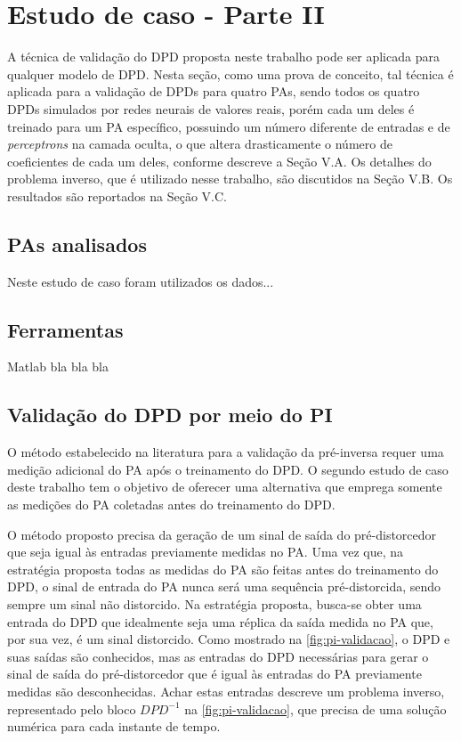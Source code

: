 \chapter{Estudo de caso - Parte II} \label{cha:estudoii}

A técnica de validação do DPD proposta neste trabalho pode ser aplicada para qualquer modelo de DPD. Nesta seção, como uma prova de conceito, {tal técnica é aplicada para a validação de DPDs para quatro PAs, sendo todos os quatro DPDs simulados por redes neurais de valores reais, porém cada um deles é treinado para um PA específico, possuindo um número diferente de entradas e de \textit{perceptrons} na camada oculta, o que altera drasticamente o número de coeficientes de cada um deles, conforme descreve a Seção V.A}. Os detalhes do problema inverso, que é utilizado nesse trabalho, são discutidos na Seção V.B. Os resultados são reportados na Seção V.C.

\section{PAs analisados} \label{sec:estudoii-pas}
Neste estudo de caso foram utilizados os dados...

\section{Ferramentas} \label{sec:estudoii-fer}
Matlab bla bla bla

\section{Validação do DPD por meio do PI} \label{sec:estudoii-dpd}
O método estabelecido na literatura para a validação da pré-inversa requer uma medição adicional do PA após o treinamento do DPD. O segundo estudo de caso deste trabalho tem o objetivo de oferecer uma alternativa que emprega somente as medições do PA coletadas antes do treinamento do DPD.

O método proposto precisa da geração de um sinal de saída do pré-distorcedor que seja igual às entradas previamente medidas no PA. Uma vez que, na estratégia proposta todas as medidas do PA são feitas antes do treinamento do DPD, o sinal de entrada do PA nunca será uma sequência pré-distorcida, sendo sempre um sinal não distorcido. Na estratégia proposta, busca-se obter uma entrada do DPD que idealmente seja uma réplica da saída medida no PA que, por sua vez, é um sinal distorcido. Como mostrado na \autoref{fig:pi-validacao}, o DPD e suas saídas são conhecidos, mas as entradas do DPD necessárias para gerar o sinal de saída do pré-distorcedor que é igual às entradas do PA previamente medidas são desconhecidas. Achar estas entradas descreve um problema inverso, representado pelo bloco $DPD^{-1}$ na \autoref{fig:pi-validacao}, que precisa de uma solução numérica para cada instante de tempo.

